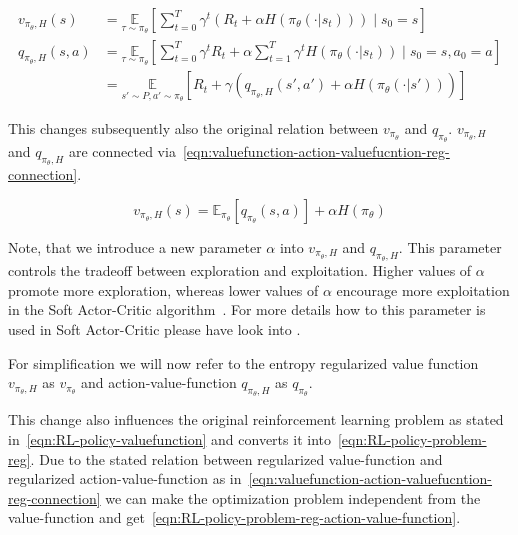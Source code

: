 \begin{align}
	v_{\pi_\theta, H}(s) &= \underset{\tau\sim\pi_\theta}{\mathbb{E}}\left[\sum_{t=0}^T\gamma^t\left(R_t + \alpha H(\pi_\theta(\cdot|s_t))\right)\mid s_0 = s\right]\label{eqn:valuefunction-entropy-reg} \\
	q_{\pi_\theta, H}(s, a) &= \underset{\tau\sim\pi_\theta}{\mathbb{E}}\left[\sum_{t=0}^T\gamma^t R_t + \alpha \sum_{t=1}^T \gamma^t H(\pi_\theta(\cdot|s_t))\mid s_0 = s, a_0=a\right]\label{eqn:action-valuefunction-entropy-reg} \\
	&= \underset{s'\sim P, a' \sim \pi_\theta}{\mathbb{E}}\left[R_t + \gamma (q_{\pi_\theta, H}(s', a') + \alpha H(\pi_\theta(\cdot|s')))\right]\label{eqn:action-valuefunction-entropy-reg-recursive} 
\end{align} 

This changes subsequently also the original relation between $v_{\pi_\theta}$ and $q_{\pi_\theta}$. $v_{\pi_\theta, H}$ and $q_{\pi_\theta, H}$ are connected via~\eqref{eqn:valuefunction-action-valuefucntion-reg-connection}.

\begin{equation}\label{eqn:valuefunction-action-valuefucntion-reg-connection}
	v_{\pi_\theta, H}(s) = \mathbb{E}_{\pi_\theta}\left[q_{\pi_\theta}(s, a)\right] + \alpha H(\pi_\theta)
\end{equation} 

Note, that we introduce a new parameter $\alpha$ into $v_{\pi_\theta,H}$ and $q_{\pi_\theta,H}$. This parameter controls the tradeoff between exploration and exploitation.  Higher values of $\alpha$ promote more exploration, whereas lower values of $\alpha$ encourage more exploitation in the Soft Actor-Critic algorithm~\cite{SpinningUp2018}. For more details how to this parameter is used in Soft Actor-Critic please have look into .

For simplification we will now refer to the entropy regularized value function $v_{\pi_\theta,H}$ as $v_{\pi_\theta}$ and action-value-function $q_{\pi_\theta,H}$ as $q_{\pi_\theta}$. 

This change also influences the original reinforcement learning problem as stated in~\eqref{eqn:RL-policy-valuefunction} and converts it into~\eqref{eqn:RL-policy-problem-reg}. Due to the stated relation between regularized value-function and regularized action-value-function as in~\eqref{eqn:valuefunction-action-valuefucntion-reg-connection} we can make the optimization problem independent from the value-function and get~\eqref{eqn:RL-policy-problem-reg-action-value-function}.

